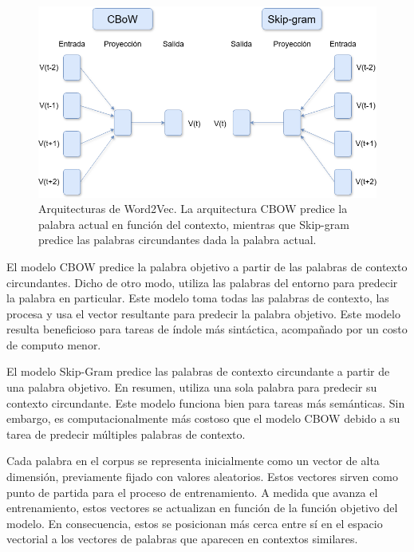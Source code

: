 \begin{figure}[H]
    \centering
    \includegraphics[width=1\textwidth]{imagenes/word2vec.drawio.png}
    \caption{Arquitecturas de Word2Vec. La arquitectura CBOW predice la palabra actual en función del contexto, mientras que Skip-gram predice las palabras circundantes dada la palabra actual.}
    \label{fig:word2vec}
\end{figure}


El modelo CBOW predice la palabra objetivo a partir de las palabras de contexto circundantes. Dicho de otro modo, utiliza las palabras del entorno para predecir la palabra en particular. Este modelo toma todas las palabras de contexto, las procesa y usa el vector resultante para predecir la palabra objetivo. Este modelo resulta beneficioso para tareas de índole más sintáctica, acompañado por un costo de computo menor. \parencite{mikolov2013efficientestimationwordrepresentations}


El modelo Skip-Gram predice las palabras de contexto circundante a partir de una palabra objetivo. En resumen, utiliza una sola palabra para predecir su contexto circundante.
Este modelo funciona bien para tareas más semánticas. \parencite{mikolov2013efficientestimationwordrepresentations} Sin embargo, es computacionalmente más costoso que el modelo CBOW debido a su tarea de predecir múltiples palabras de contexto.


Cada palabra en el corpus se representa inicialmente como un vector de alta dimensión, previamente fijado con valores aleatorios. Estos vectores sirven como punto de partida para el proceso de entrenamiento. A medida que avanza el entrenamiento, estos vectores se actualizan en función de la función objetivo del modelo. En consecuencia, estos se posicionan más cerca entre sí en el espacio vectorial a los vectores de palabras que aparecen en contextos similares.

